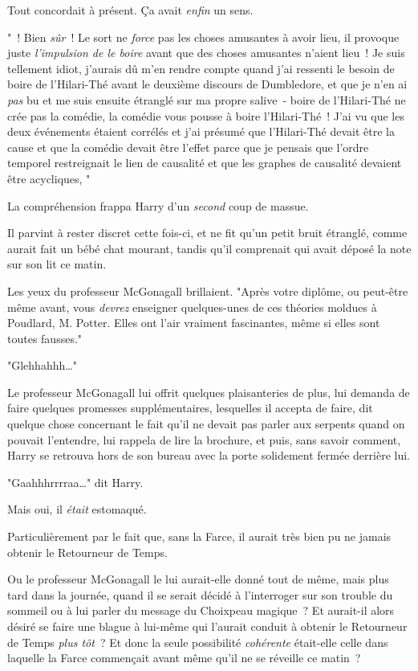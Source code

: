 Tout concordait à présent. Ça avait \emph{enfin} un sens.

"~! Bien \emph{sûr}~! Le sort ne \emph{force} pas les choses amusantes à avoir lieu, il provoque juste \emph{l'impulsion de le boire} avant que des choses amusantes n'aient lieu~! Je suis tellement idiot, j'aurais dû m'en rendre compte quand j'ai ressenti le besoin de boire de l'Hilari-Thé avant le deuxième discours de Dumbledore, et que je n'en ai \emph{pas} bu et me suis ensuite étranglé sur ma propre salive~- boire de l'Hilari-Thé ne crée pas la comédie, la comédie vous pousse à boire l'Hilari-Thé~! J'ai vu que les deux événements étaient corrélés et j'ai présumé que l'Hilari-Thé devait être la cause et que la comédie devait être l'effet parce que je pensais que l'ordre temporel restreignait le lien de causalité et que les graphes de causalité devaient être acycliques, "

La compréhension frappa Harry d'un \emph{second} coup de massue.

Il parvint à rester discret cette fois-ci, et ne fit qu'un petit bruit étranglé, comme aurait fait un bébé chat mourant, tandis qu'il comprenait qui avait déposé la note sur son lit ce matin.

Les yeux du professeur McGonagall brillaient. "Après votre diplôme, ou peut-être même avant, vous \emph{devrez} enseigner quelques-unes de ces théories moldues à Poudlard, M. Potter. Elles ont l'air vraiment fascinantes, même si elles sont toutes fausses."

"Glehhahhh…"

Le professeur McGonagall lui offrit quelques plaisanteries de plus, lui demanda de faire quelques promesses supplémentaires, lesquelles il accepta de faire, dit quelque chose concernant le fait qu'il ne devait pas parler aux serpents quand on pouvait l'entendre, lui rappela de lire la brochure, et puis, sans savoir comment, Harry se retrouva hors de son bureau avec la porte solidement fermée derrière lui.

"Gaahhhrrrraa…" dit Harry.

Mais oui, il \emph{était} estomaqué.

Particulièrement par le fait que, sans la Farce, il aurait très bien pu ne jamais obtenir le Retourneur de Temps.

Ou le professeur McGonagall le lui aurait-elle donné tout de même, mais plus tard dans la journée, quand il se serait décidé à l'interroger sur son trouble du sommeil ou à lui parler du message du Choixpeau magique~? Et aurait-il alors désiré se faire une blague à lui-même qui l'aurait conduit à obtenir le Retourneur de Temps \emph{plus tôt}~? Et donc la seule possibilité \emph{cohérente} était-elle celle dans laquelle la Farce commençait avant même qu'il ne se réveille ce matin~?

